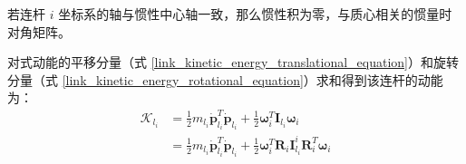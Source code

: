 \documentclass[cn,11pt,chinese,blue,bibstyle=ieeetr]{elegantbook}
\begin{document}
若连杆 $i$ 坐标系的轴与惯性中心轴一致，那么惯性积为零，与质心相关的惯量时对角矩阵。

对式动能的平移分量（式 \ref{link_kinetic_energy_translational_equation}）和旋转分量（式 \ref{link_kinetic_energy_rotational_equation}）求和得到该连杆的动能为：
\begin{equation}\label{link_kinetic_energy_cartesian_expression}
\begin{aligned}
\mathcal{K}_{l_i} &= \frac{1}{2} m_{l_i} {{\bm{\dot p}}_{l_i}^{T}} {{\bm{\dot p}}_{l_i}} + \frac{1}{2} \bm{\omega}_i^T \bm{I}_{l_i} \bm{\omega}_i \\
&= \frac{1}{2} m_{l_i} {{\bm{\dot p}}_{l_i}^{T}} {{\bm{\dot p}}_{l_i}} + \frac{1}{2} \bm{\omega}_i^T \bm{R}_i \bm{I}_{l_i}^i \bm{R}_i^T \bm{\omega}_i
\end{aligned}
\end{equation}
\end{document}
